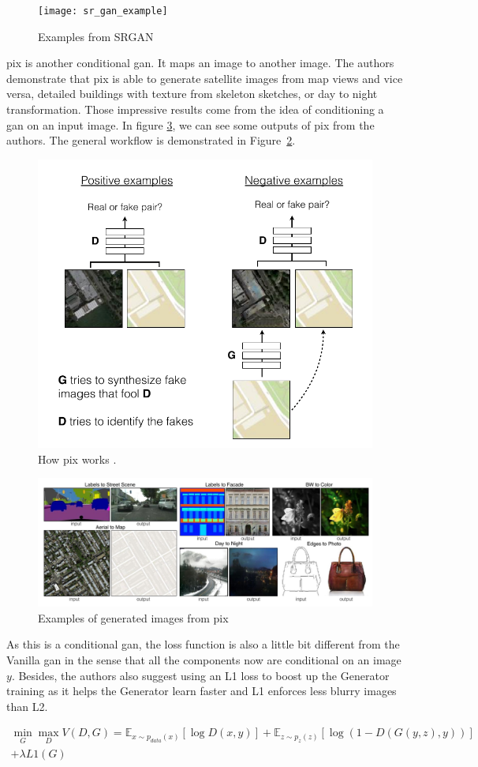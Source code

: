 \begin{figure}[h!]
	\centering
	\texttt{[image: sr\_gan\_example]}
	\caption{Examples from SRGAN \cite{sr_gan}}
	\label{fig:sr_gan_example}
\end{figure}

\acrfull{pix} \cite{pix2pix} is another conditional \acrshort{gan}. It maps an image to
another image. The authors demonstrate that \acrshort{pix} is able to generate satellite
images from map views and vice versa, detailed buildings with texture from skeleton
sketches, or day to night transformation. Those impressive results come from the idea of
conditioning a \acrshort{gan} on an input image. In figure \ref{fig:pix2pix_examples}, we
can see some outputs of \acrshort{pix} from the authors.  The general workflow is
demonstrated in Figure~\ref{fig:pix2pix_workflow}.

\begin{figure}[h!]
	\centering
	\includegraphics[width=0.5\linewidth]{img/pix2pix_workflow}
	\caption{How \acrshort{pix} works \cite{pix2pix}.}
	\label{fig:pix2pix_workflow}
\end{figure}

\begin{figure}[h!]
	\centering
	\includegraphics[width=0.8\linewidth]{img/pix2pix_examples}
	\caption{Examples of generated images from \acrshort{pix} \cite{pix2pix} }
	\label{fig:pix2pix_examples}
\end{figure}

As this is a conditional \acrshort{gan}, the loss function is also a little bit different
from the Vanilla \acrshort{gan} in the sense that all the components now are conditional
on an image $y$.  Besides, the authors also suggest using an L1 loss to boost up the
Generator training as it helps the Generator learn faster and L1 enforces less blurry
images than L2.

\begin{align*}
	\min_{G} \max_{D} V(D, G) = \mathbb{E}_{x \sim p_{data}(x)} [\log D(x, y)] +
	\mathbb{E}_{z \sim p_z(z)}[\log(1 - D(G(y, z), y))] \\ 
	+ \lambda L1(G)
\end{align*}

